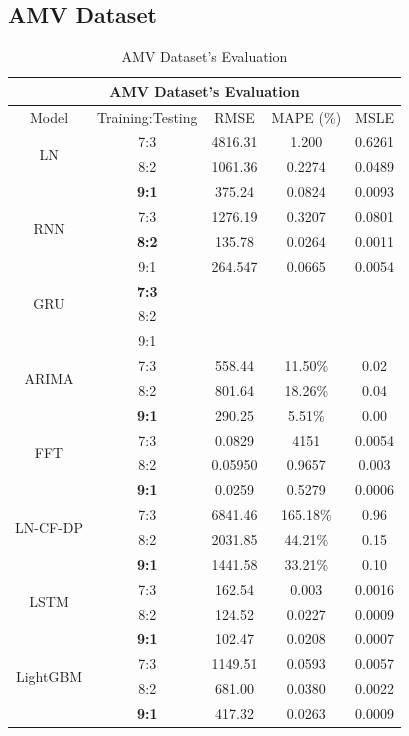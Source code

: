 \documentclass{ieeeojies}
\begin{document}
\subsection{AMV Dataset} 
\begin{table}[H]
    \centering
    \begin{tabular}{|c|c|c|c|c|}
         \hline
         \multicolumn{5}{|c|}{\textbf{AMV Dataset's Evaluation}}\\
         \hline
         \centering Model & Training:Testing & RMSE & MAPE (\%) & MSLE\\
         \hline
         \multirow{2}{*}{LN}& 7:3 & 4816.31 & 1.200 & 0.6261\\ & 8:2 & 1061.36 & 0.2274 & 0.0489\\ & \textbf{9:1}& 375.24& 0.0824 & 0.0093\\
         \hline
         \multirow{2}{*}{RNN} & 7:3&1276.19&0.3207&0.0801\\ & \textbf{8:2}&135.78&0.0264&0.0011\\ & 9:1  &264.547 &0.0665 &0.0054 \\
         \hline
         \multirow{2}{*}{GRU} & \textbf{7:3}	& & & \\ & 8:2 & & & \\ & 9:1 & & & \\
         \hline
         \multirow{2}{*}{ARIMA} & 7:3 & 558.44 & 11.50\% & 0.02 \\ & 8:2 & 801.64 & 18.26\% & 0.04 \\ & \textbf{9:1} & 290.25 & 5.51\% & 0.00\\
         \hline
         \multirow{2}{*}{FFT}& 7:3	& 0.0829& 4151& 0.0054\\ & 8:2 & 0.05950& 0.9657& 0.003\\ & \textbf{9:1} & 0.0259& 0.5279& 0.0006\\
         \hline
         \multirow{2}{*}{LN-CF-DP} & 7:3 & 6841.46 & 165.18\% & 0.96 \\ & 8:2 &2031.85	& 44.21\%&  0.15 \\ & \textbf{9:1} &1441.58&33.21\% & 0.10\\
         \hline
         \multirow{2}{*}{LSTM}& 7:3& 162.54& 0.003& 0.0016\\ & 8:2 & 124.52& 0.0227& 0.0009\\ & \textbf{9:1}& 102.47& 0.0208& 0.0007\\
         \hline
         \multirow{2}{*}{LightGBM}& 7:3& 1149.51& 0.0593 & 0.0057\\ & 8:2 & 681.00& 0.0380 & 0.0022\\ & \textbf{9:1}& 417.32& 0.0263 & 0.0009\\
         \hline
    \end{tabular}
    \caption{AMV Dataset's Evaluation}
    \label{vcbresult}
\end{table}
\end{document}
